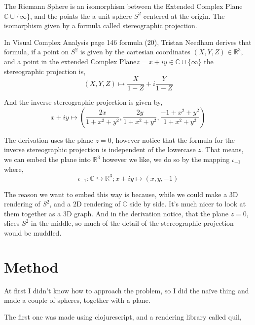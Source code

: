 \documentclass{article}
\newcommand\R{\mathbb{R}}
\newcommand\C{\mathbb{C}}
\begin{document}
The Riemann Sphere is an isomorphism between the Extended Complex
Plane $\C\cup \{\infty\}$, and the points the a unit sphere $S^2$ centered at
the origin. The isomorphism given by a formula called stereographic
projection.

In Visual Complex Analysis page 146 formula (20), Tristan Needham
derives that formula, if a point on $S^2$ is given by the
cartesian coordinates $(X,Y,Z)\in \R^3$, and a point in the extended
Complex Plane$z = x+iy\in \C\cup \{\infty\}$ the stereographic
projection is,
\[(X,Y,Z)\mapsto \frac{X}{1-Z}+i\frac{Y}{1-Z}\]

And the inverse stereographic projection is given by,
\[x+iy \mapsto \left( \frac{2x}{1+x^2+y^2},\frac{2y}{1+x^2+y^2},
    \frac{-1+x^2+y^2}{1+x^2+y^2}\right)\]

The derivation uses the plane $z=0$, however notice that the
formula for the inverse stereographic projection is independent of the
lowercase $z$. That means, we can embed the plane into $\R^3$ however
we like, we do so by the mapping $\iota_{-1}$ where,
\[\iota_{-1}: \C\hookrightarrow\R^3;
  x+iy\mapsto (x,y,-1)\]

The reason we want to embed this way is because, while we could make a
$3$D rendering of $S^2$, and a $2$D rendering of $\C$ side by
side. It's much nicer to look at them together as a $3$D graph. And in the derivation
notice, that the plane $z = 0$, slices $S^2$ in the middle, so much of
the detail of the stereographic projection would be muddled.


\section{Method}

At first I didn't know how to approach the problem, so I did the
na\"ive thing and made a couple of spheres, together with a plane.

The first one was made using clojurescript, and a rendering library
called quil,
\end{document}
